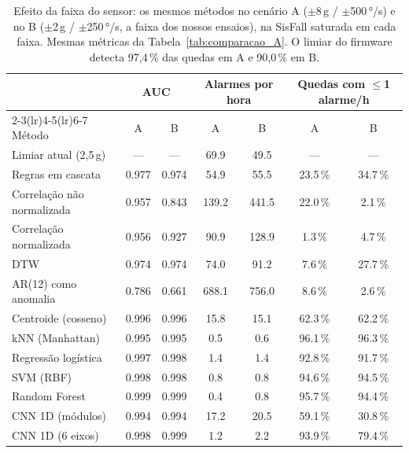 \begin{table}[H]
\centering
\caption{Efeito da faixa do sensor: os mesmos métodos no cenário A ($\pm$8\,g / $\pm$500\,°/s) e no B ($\pm$2\,g / $\pm$250\,°/s, a faixa dos nossos ensaios), na SisFall saturada em cada faixa. Mesmas métricas da Tabela~\ref{tab:comparacao_A}. O limiar do firmware detecta 97,4\,\% das quedas em A e 90,0\,\% em B.}
\label{tab:cenarios_AB}
\small
\setlength{\tabcolsep}{4pt}
\begin{tabular}{@{}lcccccc@{}}
\toprule
 & \multicolumn{2}{c}{AUC} & \multicolumn{2}{c}{Alarmes por hora} & \multicolumn{2}{c}{Quedas com $\le$1 alarme/h} \\
\cmidrule(lr){2-3}\cmidrule(lr){4-5}\cmidrule(lr){6-7}
Método & A & B & A & B & A & B \\
\midrule
Limiar atual (2,5\,g) & --- & --- & \num{69.9} & \num{49.5} & --- & --- \\
Regras em cascata & \num{0.977} & \num{0.974} & \num{54.9} & \num{55.5} & \num{23.5}\,\% & \num{34.7}\,\% \\
Correlação não normalizada & \num{0.957} & \num{0.843} & \num{139.2} & \num{441.5} & \num{22.0}\,\% & \num{2.1}\,\% \\
Correlação normalizada & \num{0.956} & \num{0.927} & \num{90.9} & \num{128.9} & \num{1.3}\,\% & \num{4.7}\,\% \\
DTW & \num{0.974} & \num{0.974} & \num{74.0} & \num{91.2} & \num{7.6}\,\% & \num{27.7}\,\% \\
AR(12) como anomalia & \num{0.786} & \num{0.661} & \num{688.1} & \num{756.0} & \num{8.6}\,\% & \num{2.6}\,\% \\
Centroide (cosseno) & \num{0.996} & \num{0.996} & \num{15.8} & \num{15.1} & \num{62.3}\,\% & \num{62.2}\,\% \\
kNN (Manhattan) & \num{0.995} & \num{0.995} & \num{0.5} & \num{0.6} & \num{96.1}\,\% & \num{96.3}\,\% \\
Regressão logística & \num{0.997} & \num{0.998} & \num{1.4} & \num{1.4} & \num{92.8}\,\% & \num{91.7}\,\% \\
SVM (RBF) & \num{0.998} & \num{0.998} & \num{0.8} & \num{0.8} & \num{94.6}\,\% & \num{94.5}\,\% \\
Random Forest & \num{0.999} & \num{0.999} & \num{0.4} & \num{0.8} & \num{95.7}\,\% & \num{94.4}\,\% \\
CNN 1D (módulos) & \num{0.994} & \num{0.994} & \num{17.2} & \num{20.5} & \num{59.1}\,\% & \num{30.8}\,\% \\
CNN 1D (6 eixos) & \num{0.998} & \num{0.999} & \num{1.2} & \num{2.2} & \num{93.9}\,\% & \num{79.4}\,\% \\
\bottomrule
\end{tabular}
\end{table}
